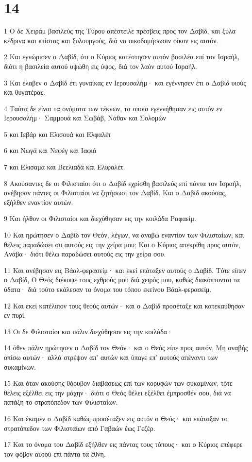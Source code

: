 \chapter{14}

\par 1 Ο δε Χειράμ βασιλεύς της Τύρου απέστειλε πρέσβεις προς τον Δαβίδ, και ξύλα κέδρινα και κτίστας και ξυλουργούς, διά να οικοδομήσωσιν οίκον εις αυτόν.
\par 2 Και εγνώρισεν ο Δαβίδ, ότι ο Κύριος κατέστησεν αυτόν βασιλέα επί τον Ισραήλ, διότι η βασιλεία αυτού υψώθη εις ύψος, διά τον λαόν αυτού Ισραήλ.
\par 3 Και έλαβεν ο Δαβίδ έτι γυναίκας εν Ιερουσαλήμ· και εγέννησεν έτι ο Δαβίδ υιούς και θυγατέρας.
\par 4 Ταύτα δε είναι τα ονόματα των τέκνων, τα οποία εγεννήθησαν εις αυτόν εν Ιερουσαλήμ· Σαμμουά και Σωβάβ, Νάθαν και Σολομών
\par 5 και Ιεβάρ και Ελισουά και Ελφαλέτ
\par 6 και Νωγά και Νεφέγ και Ιαφιά
\par 7 και Ελισαμά και Βεελιαδά και Ελιφαλέτ.
\par 8 Ακούσαντες δε οι Φιλισταίοι ότι ο Δαβίδ εχρίσθη βασιλεύς επί πάντα τον Ισραήλ, ανέβησαν πάντες οι Φιλισταίοι να ζητήσωσι τον Δαβίδ. Και ο Δαβίδ ακούσας, εξήλθεν εναντίον αυτών.
\par 9 Και ήλθον οι Φιλισταίοι και διεχύθησαν εις την κοιλάδα Ραφαείμ.
\par 10 Και ηρώτησεν ο Δαβίδ τον Θεόν, λέγων, να αναβώ εναντίον των Φιλισταίων; και θέλεις παραδώσει συ αυτούς εις την χείρα μου; Και ο Κύριος απεκρίθη προς αυτόν, Ανάβα· διότι θέλω παραδώσει αυτούς εις την χείρα σου.
\par 11 Και ανέβησαν εις Βάαλ-φερασείμ· και εκεί επάταξεν αυτούς ο Δαβίδ. Τότε είπεν ο Δαβίδ, Ο Θεός διέκοψε τους εχθρούς μου διά χειρός μου, καθώς διακόπτονται τα ύδατα· διά τούτο εκάλεσαν το όνομα του τόπου εκείνου Βάαλ-φερασείμ.
\par 12 Και εκεί κατέλιπον τους θεούς αυτών· και ο Δαβίδ προσέταξε και κατεκαύθησαν εν πυρί.
\par 13 Οι δε Φιλισταίοι και πάλιν διεχύθησαν εις την κοιλάδα·
\par 14 όθεν πάλιν ηρώτησεν ο Δαβίδ τον Θεόν· και ο Θεός είπε προς αυτόν, Μη αναβής οπίσω αυτών· αλλά στρέψον απ' αυτών και ύπαγε επ' αυτούς απέναντι των συκαμίνων.
\par 15 Και όταν ακούσης θόρυβον διαβάσεως επί των κορυφών των συκαμίνων, τότε θέλεις εξέλθει εις την μάχην· διότι ο Θεός θέλει εξέλθει έμπροσθέν σου, διά να πατάξη το στρατόπεδον των Φιλισταίων.
\par 16 Και έκαμεν ο Δαβίδ καθώς προσέταξεν εις αυτόν ο Θεός· και επάταξαν το στρατόπεδον των Φιλισταίων από Γαβαών έως Γεζέρ.
\par 17 Και το όνομα του Δαβίδ εξήλθεν εις πάντας τους τόπους· και ο Κύριος επέφερε τον φόβον αυτού επί πάντα τα έθνη.

